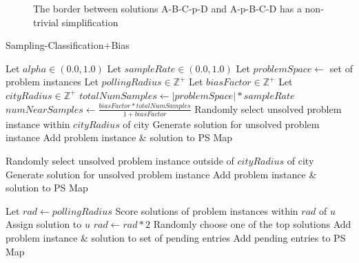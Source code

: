 \begin{figure}
\caption{The border between solutions A-B-C-p-D and A-p-B-C-D has a non-trivial simplification}
\label{fig:sbe-complex-eq} 
\end{figure}


\begin{algorithm}
\caption{Sampling-Classification+Bias}   
\label{alg:sc+bias}
\small
\begin{algorithmic}[1] %
  
  \State Let $alpha \in (0.0,1.0)$
  \State Let $sampleRate \in (0.0,1.0)$
  \State Let $problemSpace \leftarrow$ set of problem instances
  \State Let $pollingRadius \in \mathbb{Z}^+$ 
  \State Let $biasFactor \in \mathbb{Z}^+$ 
  \State Let $cityRadius \in \mathbb{Z}^+$ 
  \State $totalNumSamples \leftarrow |problemSpace| * sampleRate$
  \State $numNearSamples \leftarrow \frac{biasFactor * totalNumSamples}{1+biasFactor}$
    \State Randomly select unsolved problem instance within $cityRadius$ of city
    \State Generate solution for unsolved problem instance
    \State Add problem instance \& solution to PS Map
  \EndFor

    \State Randomly select unsolved problem instance outside of $cityRadius$ of city
    \State Generate solution for unsolved problem instance
    \State Add problem instance \& solution to PS Map
  \EndFor

    \State Let $rad \leftarrow pollingRadius$
      \State Score solutions of problem instances within $rad$ of $u$
        \State Assign solution to $u$
      \Else 
        \State $rad \leftarrow rad * 2$
      \EndIf
    \EndWhile
      \State Randomly choose one of the top solutions
    \EndIf
    \State Add problem instance \& solution to set of pending entries 
  \EndFor
  \State Add pending entries to PS Map 
\end{algorithmic}
\end{algorithm}






